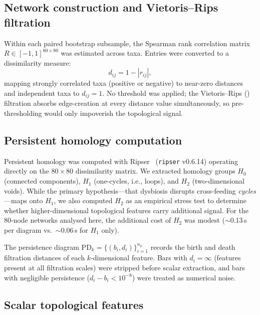 \subsection{Network construction and Vietoris--Rips filtration}
\label{subsec:networks}

Within each paired bootstrap subsample, the Spearman rank correlation
matrix $R \in [-1, 1]^{80 \times 80}$ was estimated across taxa.
Entries were converted to a dissimilarity measure:
\begin{equation}
  d_{ij} = 1 - |r_{ij}|,
  \label{eq:dist}
\end{equation}
mapping strongly correlated taxa (positive or negative) to near-zero
distances and independent taxa to $d_{ij} = 1$.
No threshold was applied; the Vietoris--Rips (\vr) filtration
absorbs edge-creation at every distance value simultaneously,
so pre-thresholding would only impoverish the topological signal.

\subsection{Persistent homology computation}
\label{subsec:ph}

Persistent homology was computed with Ripser~\citep{tralie2018ripser}
(\texttt{ripser} v0.6.14) operating directly on the
$80 \times 80$ dissimilarity matrix.
We extracted homology groups $H_0$ (connected components), $H_1$
(one-cycles, i.e., loops), and $H_2$ (two-dimensional voids).
While the primary hypothesis---that dysbiosis disrupts cross-feeding
\emph{cycles}---maps onto $H_1$, we also computed $H_2$ as an
empirical stress test to determine whether higher-dimensional
topological features carry additional signal.
For the 80-node networks analysed here, the additional cost of $H_2$
was modest ($\sim$0.13\,s per diagram vs.\ $\sim$0.06\,s for $H_1$ only).

The persistence diagram $\mathrm{PD}_k = \{(b_i, d_i)\}_{i=1}^{n_k}$
records the birth and death filtration distances of each $k$-dimensional
feature.
Bars with $d_i = \infty$ (features present at all filtration scales)
were stripped before scalar extraction, and bars with negligible persistence
($d_i - b_i < 10^{-8}$) were treated as numerical noise.

\subsection{Scalar topological features}
\label{subsec:features}

